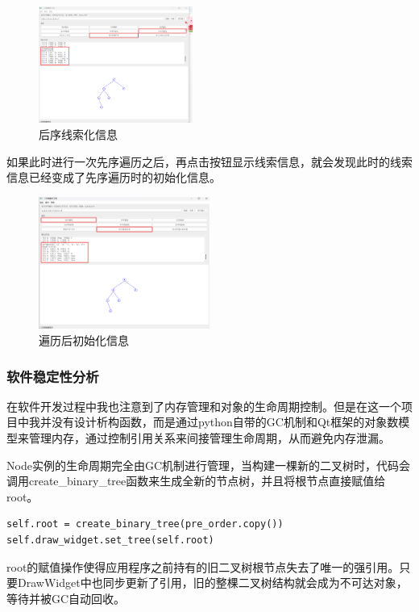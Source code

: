 \documentclass[12pt,a4paper]{article}
\begin{document}
\begin{figure}[H]
    \centering
    \includegraphics[width=0.45\textwidth]{pt1-12.png}
    \caption{后序线索化信息}
\end{figure}

如果此时进行一次先序遍历之后，再点击按钮显示线索信息，就会发现此时的线索信息已经变成了先序遍历时的初始化信息。

\begin{figure}[H]
    \centering
    \includegraphics[width=0.5\textwidth]{pt1-13.png}
    \caption{遍历后初始化信息}
\end{figure}

\subsubsection{软件稳定性分析}

在软件开发过程中我也注意到了内存管理和对象的生命周期控制。但是在这一个项目中我并没有设计析构函数，而是通过python自带的GC机制和Qt框架的对象数模型来管理内存，通过控制引用关系来间接管理生命周期，从而避免内存泄漏。

Node实例的生命周期完全由GC机制进行管理，当构建一棵新的二叉树时，代码会调用create\_binary\_tree函数来生成全新的节点树，并且将根节点直接赋值给root。

\begin{verbatim}
self.root = create_binary_tree(pre_order.copy())
self.draw_widget.set_tree(self.root)
\end{verbatim}

root的赋值操作使得应用程序之前持有的旧二叉树根节点失去了唯一的强引用。只要DrawWidget中也同步更新了引用，旧的整棵二叉树结构就会成为不可达对象，等待并被GC自动回收。
\end{document}
